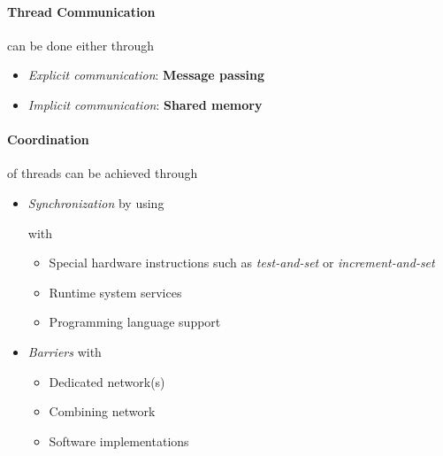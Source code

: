 \paragraph{Thread Communication} can be done either through
\begin{itemize}
	\item \emph{Explicit communication}: {\bf Message passing}

	\item \emph{Implicit communication}: {\bf Shared memory}
\end{itemize}


\paragraph{Coordination} of threads can be achieved through
\begin{itemize}
	\item \emph{Synchronization} by using
		with
		\begin{itemize}
			\item Special hardware instructions such as \emph{test-and-set} or \emph{increment-and-set}
			\item Runtime system services
			\item Programming language support
		\end{itemize}

	\item \emph{Barriers} with
		\begin{itemize}
			\item Dedicated network(s)
			\item Combining network
			\item Software implementations
		\end{itemize}
\end{itemize}

